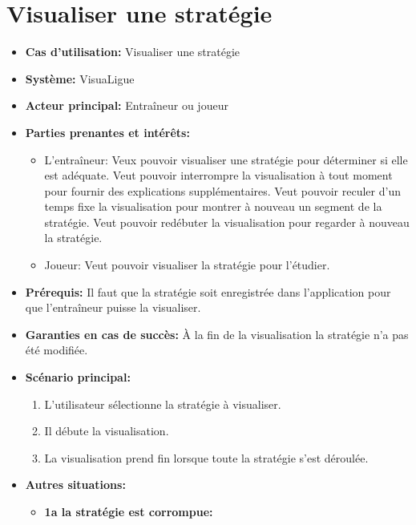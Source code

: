 \section{Visualiser une stratégie}
\label{sec:visualiser_une_strategie}
\begin{itemize}
    \item \textbf{Cas d'utilisation:} Visualiser une strat\'egie
    \item \textbf{Syst\`eme:} VisuaLigue
    \item \textbf{Acteur principal:} Entra\^ineur ou joueur
    \item \textbf{Parties prenantes et int\'er\^ets:}
        \begin{itemize}
            \item L'entra\^ineur: Veux pouvoir visualiser une strat\'egie pour d\'eterminer si elle est ad\'equate.
                Veut pouvoir interrompre la visualisation \`a tout moment pour fournir des explications suppl\'ementaires.
                Veut pouvoir reculer d'un temps fixe la visualisation pour montrer \`a nouveau un segment de la strat\'egie.
                Veut pouvoir red\'ebuter la visualisation pour regarder \`a nouveau la strat\'egie.
            \item Joueur: Veut pouvoir visualiser la strat\'egie pour l'\'etudier.
        \end{itemize}
    \item \textbf{Pr\'erequis:} Il faut que la strat\'egie soit enregistr\'ee dans l'application pour que l'entraîneur puisse la visualiser.
    \item \textbf{Garanties en cas de succ\`es:} \`A la fin de la visualisation la strat\'egie n'a pas \'et\'e modifi\'ee.
    \item \textbf{Sc\'enario principal:}
        \begin{enumerate}
            \item L'utilisateur s\'electionne la strat\'egie \`a visualiser.
            \item Il d\'ebute la visualisation.
            \item La visualisation prend fin lorsque toute la strat\'egie s'est d\'eroul\'ee.
        \end{enumerate}
    \item \textbf{Autres situations:}
        \begin{itemize}
            \item \textbf{1a la strat\'egie est corrompue:}
                \begin{enumerate}

\end{enumerate}
\end{itemize}
\end{itemize}
